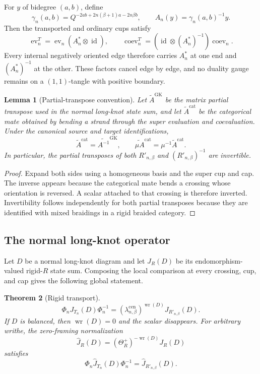 \documentclass[11pt,a4paper]{article}
\newcommand{\ot}{\otimes}
\newcommand{\id}{\operatorname{id}}
\newcommand{\ev}{\operatorname{ev}}
\newcommand{\coev}{\operatorname{coev}}
\newcommand{\Writhe}{\operatorname{wr}}
\newcommand{\cen}{\mathrm{cen}}
\newtheorem{theorem}{Theorem}[section]
\newtheorem{lemma}[theorem]{Lemma}
\theoremstyle{definition}
\theoremstyle{remark}
\begin{document}
For \(y\) of bidegree \((a,b)\), define
\[
 \gamma_n(a,b)=Q^{-2ab+2n(\beta+1)a-2n\beta b},
\qquad
 A_n(y)=\gamma_n(a,b)^{-1}y.
\]
Then the transported and ordinary cups satisfy
\begin{equation}\label{eq:cup-gauge}
\ev_n^T=\ev_n(A_n^*\ot\id),\qquad
\coev_n^T=(\id\ot(A_n^*)^{-1})\coev_n.
\end{equation}
Every internal negatively oriented edge therefore carries \(A_n^*\) at
one end and \((A_n^*)^{-1}\) at the other.  These factors cancel edge by
edge, and no duality gauge remains on a \((1,1)\)-tangle with positive
boundary.

\begin{lemma}[Partial-transpose convention]\label{lem:partial-transpose}
Let \(\widetilde A^{\mathrm{GK}}\) be the matrix partial transpose used in
the normal long-knot state sum, and let
\(\widetilde A^{\mathrm{cat}}\) be the categorical mate obtained by
bending a strand through the super evaluation and coevaluation.  Under
the canonical source and target identifications,
\[
 \widetilde A^{\mathrm{cat}}
 =\widetilde{A^{-1}}^{\mathrm{GK}},\qquad
 \widetilde{\mu A}^{\mathrm{cat}}
 =\mu^{-1}\widetilde A^{\mathrm{cat}}.
\]
In particular, the partial transposes of both \(R'_{n,\beta}\) and
\((R'_{n,\beta})^{-1}\) are invertible.
\end{lemma}

\begin{proof}
Expand both sides using a homogeneous basis and the super cup and cap.
The inverse appears because the categorical mate bends a crossing whose
orientation is reversed.  A scalar attached to that crossing is therefore
inverted.  Invertibility follows independently for both partial
transposes because they are identified with mixed braidings in a rigid
braided category.
\end{proof}

\subsection{The normal long-knot operator}

Let \(D\) be a normal long-knot diagram and let \(J_R(D)\) be its
endomorphism-valued rigid-\(R\) state sum.  Composing the local comparison
at every crossing, cup, and cap gives the following global statement.

\begin{theorem}[Rigid transport]\label{thm:rigid}
\begin{equation}\label{eq:long-transport}
 \Phi_nJ_{T_n}(D)\Phi_n^{-1}
 =
 (\lambda_{n,\beta}^{\cen})^{\Writhe(D)}
 J_{R'_{n,\beta}}(D).
\end{equation}
If \(D\) is balanced, then \(\Writhe(D)=0\) and the scalar disappears.
For arbitrary writhe, the zero-framing normalization
\[
 \widehat J_R(D)
 =(\Theta_R^+)^{-\Writhe(D)}J_R(D)
\]
satisfies
\begin{equation}\label{eq:normalized-transport}
 \Phi_n\widehat J_{T_n}(D)\Phi_n^{-1}
 =\widehat J_{R'_{n,\beta}}(D).
\end{equation}
\end{theorem}
\end{document}
